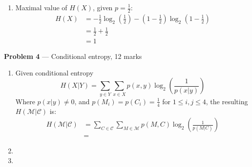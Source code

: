 \documentclass[11pt]{article}
\newcommand{\M}{\mathcal{M}}
\newcommand{\C}{\mathcal{C}}
\newcommand{\logbin}{\log_2}
\theoremstyle{definition}
\begin{document}
\begin{enumerate}
\begin{proof}
    \end{proof}
  \item
    Maximal value of $H(X)$, given $p = \frac{1}{2}$:
    \begin{equation*}
    \begin{aligned}
      H(X) &= -\frac{1}{2}\logbin (\frac{1}{2}) - (1 - \frac{1}{2})\logbin (1 - \frac{1}{2}) \\
           &= \frac{1}{2} + \frac{1}{2} \\
           &= 1
    \end{aligned}
    \end{equation*}
\end{enumerate}

\item[] \textbf{Problem 4} --- Conditional entropy, 12 marks
\begin{enumerate}
  \item
    Given conditional entropy
    \[
      H(X|Y) = \sum_{y \in Y}\sum_{x \in X}p(x, y)\logbin (\frac{1}{p(x|y)})
    \]
    Where $p(x|y) \neq 0$, and $p(M_i) = p(C_i) = \frac{1}{4}$ for $1 \leq i,j \leq 4$, the resulting $H(\M|\C)$ is:
    \begin{equation*}
    \begin{aligned}
      H(\M|\C) &= \sum_{C \in \C}\sum_{M \in \M}p(M, C)\logbin (\frac{1}{p(M|C)}) \\
               &= 
    \end{aligned}
    \end{equation*}
  \item
  \item
\end{enumerate}
\end{document}
